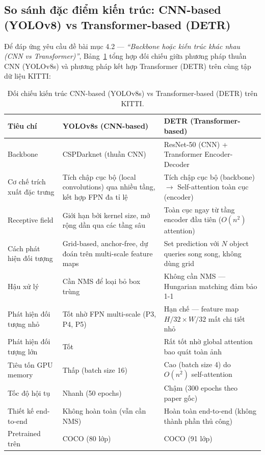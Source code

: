 \subsection{So sánh đặc điểm kiến trúc: CNN-based (YOLOv8) vs Transformer-based (DETR)}

Để đáp ứng yêu cầu đề bài mục 4.2 --- \textit{``Backbone hoặc kiến trúc khác nhau (CNN vs Transformer)''}, Bảng~\ref{tab:cnn-vs-transformer} tổng hợp đối chiếu giữa phương pháp thuần CNN (YOLOv8s) và phương pháp kết hợp Transformer (DETR) trên cùng tập dữ liệu KITTI:

\begin{table}[H]
\centering
\caption{Đối chiếu kiến trúc CNN-based (YOLOv8s) vs Transformer-based (DETR) trên KITTI.}
\label{tab:cnn-vs-transformer}
\begin{tabular}{|l|p{5.2cm}|p{5.2cm}|}
\hline
\textbf{Tiêu chí} & \textbf{YOLOv8s (CNN-based)} & \textbf{DETR (Transformer-based)} \\
\hline
Backbone & CSPDarknet (thuần CNN) & ResNet-50 (CNN) + Transformer Encoder-Decoder \\
\hline
Cơ chế trích xuất đặc trưng & Tích chập cục bộ (local convolutions) qua nhiều tầng, kết hợp FPN đa tỉ lệ & Tích chập cục bộ (backbone) $\rightarrow$ Self-attention toàn cục (encoder) \\
\hline
Receptive field & Giới hạn bởi kernel size, mở rộng dần qua các tầng sâu & Toàn cục ngay từ tầng encoder đầu tiên ($O(n^2)$ attention) \\
\hline
Cách phát hiện đối tượng & Grid-based, anchor-free, dự đoán trên multi-scale feature maps & Set prediction với $N$ object queries song song, không dùng grid \\
\hline
Hậu xử lý & Cần NMS để loại bỏ box trùng & Không cần NMS --- Hungarian matching đảm bảo 1-1 \\
\hline
Phát hiện đối tượng nhỏ & Tốt nhờ FPN multi-scale (P3, P4, P5) & Hạn chế --- feature map $H/32 \times W/32$ mất chi tiết nhỏ \\
\hline
Phát hiện đối tượng lớn & Tốt & Rất tốt nhờ global attention bao quát toàn ảnh \\
\hline
Tiêu tốn GPU memory & Thấp (batch size 16) & Cao (batch size 4) do $O(n^2)$ self-attention \\
\hline
Tốc độ hội tụ & Nhanh (50 epochs) & Chậm (300 epochs theo paper gốc) \\
\hline
Thiết kế end-to-end & Không hoàn toàn (vẫn cần NMS) & Hoàn toàn end-to-end (không thành phần thủ công) \\
\hline
Pretrained trên & COCO (80 lớp) & COCO (91 lớp) \\
\hline
\end{tabular}
\end{table}

